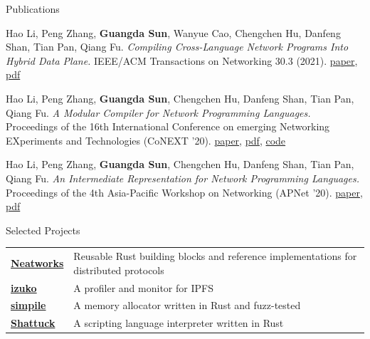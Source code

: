 \documentclass[
]{resume} %
\begin{document}
\begin{rSection}{Publications}
\begin{enumerate}[label={[}\arabic*{]}]
\item
    Hao Li, Peng Zhang, \textbf{Guangda Sun}, Wanyue Cao, Chengchen Hu, Danfeng Shan, Tian Pan, Qiang Fu.
    \textit{Compiling Cross-Language Network Programs Into Hybrid Data Plane.}
    IEEE/ACM Transactions on Networking 30.3 (2021).
    \href{http://ieeexplore.ieee.org/document/9648264}{paper},
    \href{https://github.com/sgdxbc/sgdxbc/blob/main/papers/coder-ton22-li.pdf}{pdf}

\item
    Hao Li, Peng Zhang, \textbf{Guangda Sun}, Chengchen Hu, Danfeng Shan, Tian Pan, Qiang Fu.
    \textit{A Modular Compiler for Network Programming Languages.}
    Proceedings of the 16th International Conference on emerging Networking EXperiments and Technologies (CoNEXT '20).
    \href{https://dl.acm.org/doi/10.1145/3386367.3432063}{paper},
    \href{https://github.com/sgdxbc/sgdxbc/blob/main/papers/coder-conext20-li.pdf}{pdf},
    \href{https://github.com/ants-xjtu/sidfam-v3}{code}

\item
    Hao Li, Peng Zhang, \textbf{Guangda Sun}, Chengchen Hu, Danfeng Shan, Tian Pan, Qiang Fu.
    \textit{An Intermediate Representation for Network Programming Languages.}
    Proceedings of the 4th Asia-Pacific Workshop on Networking (APNet '20).
    \href{https://dl.acm.org/doi/10.1145/3411029.3411030}{paper},
    \href{https://github.com/sgdxbc/sgdxbc/blob/main/papers/apnet20-final4.pdf}{pdf}

\end{enumerate}
\end{rSection}

\begin{rSection}{Selected Projects}
\begin{tabular}{ @{} >{\bfseries}l p{} }
\href{https://github.com/neatsys/neatworks}{Neatworks} & Reusable Rust building blocks and reference implementations for distributed protocols \\
\href{https://github.com/sgdxbc/izuko}{izuko} & A profiler and monitor for IPFS \\
\href{https://github.com/whoiscc/simpile}{simpile} & A memory allocator written in Rust and fuzz-tested \\
\href{https://github.com/whoiscc/shattuck}{Shattuck} & A scripting language interpreter written in Rust
\end{tabular}
\end{rSection}
\end{document}
